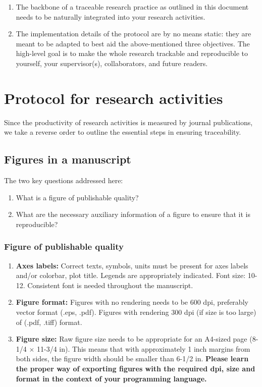 \documentclass[12pt]{article}
\begin{document}
\begin{enumerate}
    \item The backbone of a traceable research practice as outlined in this document needs to be naturally integrated into your research activities.
    \item The implementation details of the protocol are by no means static: they are meant to be adapted to best aid the above-mentioned three objectives. The high-level goal is to make the whole research trackable and reproducible to yourself, your supervisor(s), collaborators, and future readers.
\end{enumerate}

\section{Protocol for research activities}
Since the productivity of research activities is measured by journal publications, we take a reverse order to outline the essential steps in ensuring traceability.
\subsection{Figures in a manuscript}
The two key questions addressed here:

\begin{enumerate}
    \item What is a figure of publishable quality?
    \item What are the necessary auxiliary information of a figure to ensure that it is reproducible?
\end{enumerate}

\subsubsection{Figure of publishable quality}

\begin{enumerate}
    \item \textbf{Axes labels:} Correct texts, symbols, units must be present for axes labels and/or colorbar, plot title. Legends are appropriately indicated. Font size: 10-12. Consistent font is needed throughout the manuscript. 
    \item \textbf{Figure format:} Figures with no rendering needs to be 600 dpi, preferably vector format (.eps, .pdf). Figures with rendering 300 dpi (if size is too large) of (.pdf, .tiff) format. 
    \item \textbf{Figure size:} Raw figure size needs to be appropriate for an A4-sized page (8-1/4 $\times$ 11-3/4 in). This means that with approximately 1 inch margins from both sides, the figure width should be smaller than 6-1/2 in. \textbf{Please learn the proper way of exporting figures with the required dpi, size and format in the context of your programming language.} 
\end{enumerate}
\end{document}
